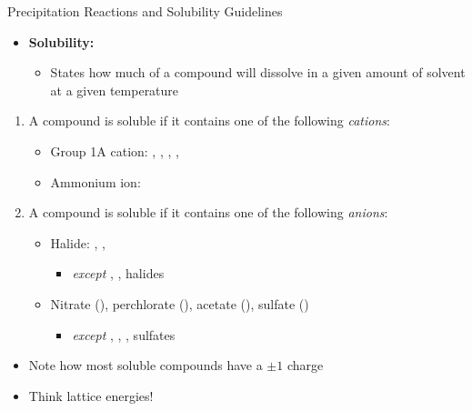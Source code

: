 \documentclass[handout]{beamer}
\begin{document}
\begin{frame}[allowframebreaks]{Precipitation Reactions and Solubility
	Guidelines}

	\begin{itemize}
		\item \textbf{Solubility:}
			\begin{itemize}
				\item States how much of a compound will
					dissolve in a given amount of solvent at
					a given temperature
			\end{itemize}
	\end{itemize}

	\framebreak

	\begin{enumerate}
		\item A compound is soluble if it contains one of the following
			\emph{cations}:

			\begin{itemize}
				\item Group 1A cation: , ,
					, , 
				\item Ammonium ion: 
			\end{itemize}

		\item A compound is soluble if it contains one of the following
			\emph{anions}:

			\begin{itemize}
				\item Halide: , , 
					\begin{itemize}
						\item \emph{except} ,
							,
							halides
					\end{itemize}
				\item Nitrate (), perchlorate
					(), acetate (),
					sulfate ()
					\begin{itemize}
						\item \emph{except}
							,
							,
							,
							 sulfates
					\end{itemize}
			\end{itemize}
	\end{enumerate}

	\framebreak

	\begin{itemize}
		\item Note how most soluble compounds have a $\pm 1$ charge
		\item Think lattice energies!
	\end{itemize}


\end{frame}
\end{document}

